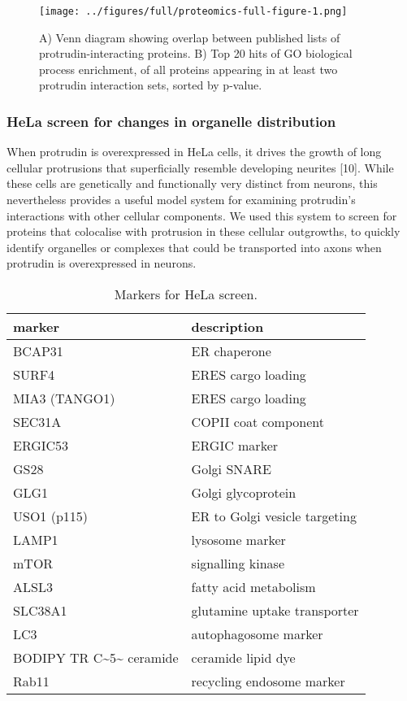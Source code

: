 \documentclass[
  12pt,
  a4paper,
]{article}
\begin{document}
\begin{figure}
\centering
\texttt{[image: ../figures/full/proteomics-full-figure-1.png]}
\caption{A) Venn diagram showing overlap between published lists of
protrudin-interacting proteins. B) Top 20 hits of GO biological process
enrichment, of all proteins appearing in at least two protrudin
interaction sets, sorted by p-value.}
\end{figure}

\hypertarget{hela-screen-for-changes-in-organelle-distribution}{%
\subsubsection{HeLa screen for changes in organelle
distribution}\label{hela-screen-for-changes-in-organelle-distribution}}

When protrudin is overexpressed in HeLa cells, it drives the growth of
long cellular protrusions that superficially resemble developing
neurites {[}10{]}. While these cells are genetically and functionally
very distinct from neurons, this nevertheless provides a useful model
system for examining protrudin's interactions with other cellular
components. We used this system to screen for proteins that colocalise
with protrusion in these cellular outgrowths, to quickly identify
organelles or complexes that could be transported into axons when
protrudin is overexpressed in neurons.

\begin{table}

\caption{\label{tab:unnamed-chunk-1}Markers for HeLa screen.}
\centering
\begin{tabular}[t]{ll}
\toprule
marker & description\\
\midrule
BCAP31 & ER chaperone\\
SURF4 & ERES cargo loading\\
MIA3 (TANGO1) & ERES cargo loading\\
SEC31A & COPII coat component\\
ERGIC53 & ERGIC marker\\
\addlinespace
GS28 & Golgi SNARE\\
GLG1 & Golgi glycoprotein\\
USO1 (p115) & ER to Golgi vesicle targeting\\
LAMP1 & lysosome marker\\
mTOR & signalling kinase\\
\addlinespace
ALSL3 & fatty acid metabolism\\
SLC38A1 & glutamine uptake transporter\\
LC3 & autophagosome marker\\
BODIPY TR C\textasciitilde{}5\textasciitilde{} ceramide & ceramide lipid dye\\
Rab11 & recycling endosome marker\\
\bottomrule
\end{tabular}
\end{table}
\end{document}
